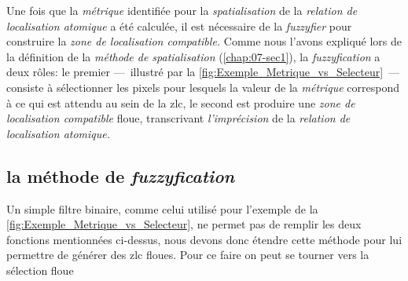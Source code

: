 Une fois que la \emph{métrique} identifiée pour la
\emph{spatialisation} de la \emph{relation de localisation atomique} a
été calculée, il est nécessaire de la \emph{fuzzyfier} pour construire
la \emph{zone de localisation compatible.} Comme nous l'avons expliqué
lors de la définition de la \emph{méthode de spatialisation}
(\autoref{chap:07-sec1}), la \emph{fuzzyfication} a deux rôles: le
premier ---~illustré par la
\autoref{fig:Exemple_Metrique_vs_Selecteur}~--- consiste à
sélectionner les pixels pour lesquels la valeur de la \emph{métrique}
correspond à ce qui est attendu au sein de la \ac{zlc}, le second est
produire une \emph{zone de localisation compatible} floue,
transcrivant \emph{l'imprécision} de la \emph{relation de localisation
  atomique.}

\subsection{la méthode de \emph{fuzzyfication}}

Un simple filtre binaire, comme celui utilisé pour l'exemple de la
\autoref{fig:Exemple_Metrique_vs_Selecteur}, ne permet pas de remplir
les deux fonctions mentionnées ci-dessus, nous devons donc étendre
cette méthode pour lui permettre de générer des \ac{zlc} floues. Pour
ce faire on peut se tourner vers la sélection floue

